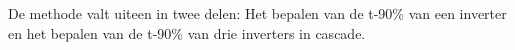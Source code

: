\documentclass{report}
\begin{document}
\newcommand{\rp}{$\rightarrow$}
\newcommand{\Ohm}{$\Omega$}
\newcommand{\ohm}{$\omega$}
\newcommand{\gmu}{$\mu$}
\newcommand{\tss}{\textsubscript}
\newcommand{\lijst}{}

De methode valt uiteen in twee delen: Het bepalen van de t-90\% van een inverter en het bepalen van de t-90\% van drie inverters in cascade. 
\begin{enumerate}
\item Voor de simulatie is het circuit in \ref{E1}
\begin{figure}
\includegraphics [scale = 0.5] [../
\end{figure}
\end{enumerate}
\end{document}
